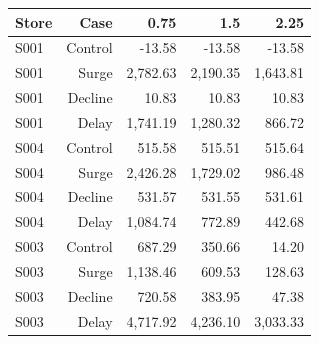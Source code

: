 \begin{tabular}{lrrrr}
\toprule
Store & Case & 0.75 & 1.5 & 2.25 \\
\midrule
S001 & Control & -13.58 & -13.58 & -13.58 \\
S001 & Surge & 2,782.63 & 2,190.35 & 1,643.81 \\
S001 & Decline & 10.83 & 10.83 & 10.83 \\
S001 & Delay & 1,741.19 & 1,280.32 & 866.72 \\
S004 & Control & 515.58 & 515.51 & 515.64 \\
S004 & Surge & 2,426.28 & 1,729.02 & 986.48 \\
S004 & Decline & 531.57 & 531.55 & 531.61 \\
S004 & Delay & 1,084.74 & 772.89 & 442.68 \\
S003 & Control & 687.29 & 350.66 & 14.20 \\
S003 & Surge & 1,138.46 & 609.53 & 128.63 \\
S003 & Decline & 720.58 & 383.95 & 47.38 \\
S003 & Delay & 4,717.92 & 4,236.10 & 3,033.33 \\
\bottomrule
\end{tabular}
